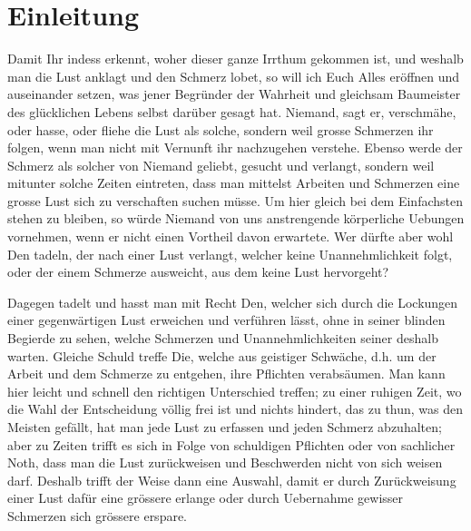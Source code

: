 \chapter{Einleitung}
Damit Ihr indess erkennt, woher dieser ganze Irrthum gekommen ist, und weshalb man die Lust anklagt und den Schmerz lobet, so will ich Euch Alles eröffnen und auseinander setzen, was jener Begründer der Wahrheit und gleichsam Baumeister des glücklichen Lebens selbst darüber gesagt hat. Niemand, sagt er, verschmähe, oder hasse, oder fliehe die Lust als solche, sondern weil grosse Schmerzen ihr folgen, wenn man nicht mit Vernunft ihr nachzugehen verstehe. Ebenso werde der Schmerz als solcher von Niemand geliebt, gesucht und verlangt, sondern weil mitunter solche Zeiten eintreten, dass man mittelst Arbeiten und Schmerzen eine grosse Lust sich zu verschaften suchen müsse. Um hier gleich bei dem Einfachsten stehen zu bleiben, so würde Niemand von uns anstrengende körperliche Uebungen vornehmen, wenn er nicht einen Vortheil davon erwartete. Wer dürfte aber wohl Den tadeln, der nach einer Lust verlangt, welcher keine Unannehmlichkeit folgt, oder der einem Schmerze ausweicht, aus dem keine Lust hervorgeht?

Dagegen tadelt und hasst man mit Recht Den, welcher sich durch die Lockungen einer gegenwärtigen Lust erweichen und verführen lässt, ohne in seiner blinden Begierde zu sehen, welche Schmerzen und Unannehmlichkeiten seiner deshalb warten. Gleiche Schuld treffe Die, welche aus geistiger Schwäche, d.h. um der Arbeit und dem Schmerze zu entgehen, ihre Pflichten verabsäumen. Man kann hier leicht und schnell den richtigen Unterschied treffen; zu einer ruhigen Zeit, wo die Wahl der Entscheidung völlig frei ist und nichts hindert, das zu thun, was den Meisten gefällt, hat man jede Lust zu erfassen und jeden Schmerz abzuhalten; aber zu Zeiten trifft es sich in Folge von schuldigen Pflichten oder von sachlicher Noth, dass man die Lust zurückweisen und Beschwerden nicht von sich weisen darf. Deshalb trifft der Weise dann eine Auswahl, damit er durch Zurückweisung einer Lust dafür eine grössere erlange oder durch Uebernahme gewisser Schmerzen sich grössere erspare.